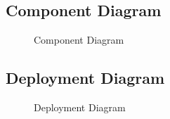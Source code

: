 \documentclass[a4paper,14pt,onecolumn]{report}
\begin{document}
	\subsection{Component Diagram}
	\begin{center}
		\begin{figure}[!htbp]
			\centering
			\caption{Component Diagram}
			\label{fig:comp-dig}
		\end{figure}
	\end{center} 
	\newpage
	\subsection{Deployment Diagram}
	\begin{center}
		\begin{figure}[!htbp]
			\centering
			\caption{Deployment Diagram}
			\label{fig:dep-dig}
		\end{figure}
	\end{center} 
	\newpage
\end{document}
